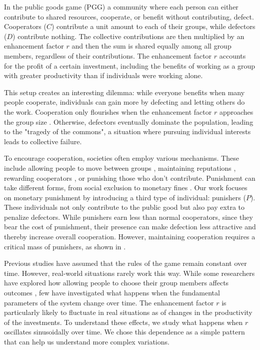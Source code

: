 In the public goods game (PGG) a community where each person can either contribute to shared resources, cooperate, or benefit without contributing, defect. Cooperators ($C$) contribute a unit amount to each of their groups, while defectors ($D$) contribute nothing. The collective contributions are then multiplied by an enhancement factor $r$ and then the sum is shared equally among all group members, regardless of their contributions. The enhancement factor $r$ accounts for the profit of a certain investment, including the benefits of working as a group with greater productivity than if individuals were working alone.

This setup creates an interesting dilemma: while everyone benefits when many people cooperate, individuals can gain more by defecting and letting others do the work. Cooperation only flourishes when the enhancement factor $r$ approaches the group size \cite{r/G}. Otherwise, defectors eventually dominate the population, leading to the "tragedy of the commons", a situation where pursuing individual interests leads to collective failure.


To encourage cooperation, societies often employ various mechanisms. These include allowing people to move between groups \cite{Migration}, maintaining reputations \cite{Reputation}, rewarding cooperators \cite{Reward}, or punishing those who don't contribute. Punishment can take different forms, from social exclusion \cite{SocialExclusion} to monetary fines \cite{Punish2}. Our work focuses on monetary punishment by introducing a third type of individual: punishers ($P$). These individuals not only contribute to the public good but also pay extra to penalize defectors. While punishers earn less than normal cooperators, since they bear the cost of punishment, their presence can make defection less attractive and thereby increase overall cooperation. However, maintaining cooperation requires a critical mass of punishers, as shown in \cite{SocialExclusion}.


Previous studies have assumed that the rules of the game remain constant over time. However, real-world situations rarely work this way. While some researchers have explored how allowing people to choose their group members affects outcomes \cite{EdgeRule}, few have investigated what happens when the fundamental parameters of the system change over time. The enhancement factor $r$ is particularly likely to fluctuate in real situations as of changes in the productivity of the investments. To understand these effects, we study what happens when $r$ oscillates sinusoidally over time. We chose this dependence as a simple pattern that can help us understand more complex variations. 

